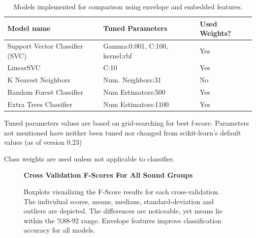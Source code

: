 \documentclass[\main/thesis.tex]{subfiles}
\begin{document}
\begin{table}[t]
    \centering \hspace*{-0.8cm}
    \begin{threeparttable}
    \begin{tabular}[width=0.95\paperwidth]{|l|l|l|}
    \hline
    Model name & Tuned Parameters\tnote{\dag}  & Used Weights? \tnote{\ddag} \\\hline
     Support Vector Classifier (SVC) &  Gamma:0.001, C:100, kernel:rbf & Yes\\
     LinearSVC & C:10 & Yes\\
     K Nearest Neighbors & Num. Neighbors:31 &  No \\
     Random Forest Classifier & Num Estimators:500 & Yes \\
     Extra Trees Classifier & Num Estimators:1100 & Yes\\
     \hline
    \end{tabular}
    \caption{Models implemented for comparison using envelope and embedded features. }
    \begin{tablenotes}
    \item[\dag] Tuned parameters values are based on grid-searching for best f-score. Parameters not mentioned have neither been tuned nor changed from scikit-learn's default values (as of version 0.23)
    \item[\ddag] Class weights are used unless not applicable to classifier.
    \end{tablenotes}
    \label{table:mem_model_selection}
    \end{threeparttable}
\end{table}

\begin{figure}[htbp!]
    \begin{center}
    \textbf{Cross Validation F-Scores For All Sound Groups}\par\medskip
    \caption{Boxplots visualizing the F-Score results for each cross-validation. The individual scores, means, medians, standard-deviation and outliers are depicted. The differences are noticeable, yet means lie within the \%88-92 range. Envelope features improve classification accuracy for all models. }
    \label{fig:f1_allg_box}
    \end{center}
\end{figure}
\end{document}
